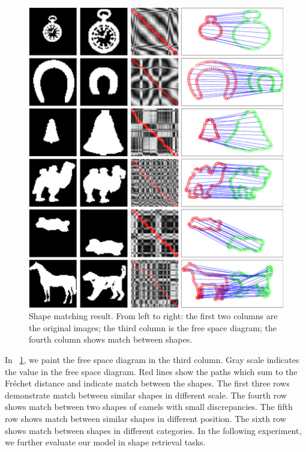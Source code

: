 \documentclass[10pt,letterpaper]{article}
\begin{document}
\begin{figure}[ht]
\begin{center}
\includegraphics[width=1\linewidth]{images/fig9.pdf}
\end{center}
\caption{Shape matching result.
From left to right: the first two columns are the original images;
the third column is the free space diagram;
the fourth column shows match between shapes.} 
\label{fig:9}
\end{figure}

In \figurename~\ref{fig:9},
we paint the free space diagram in the third column.
Gray scale indicates the value in the free space diagram.
Red lines show the paths which sum to the Fr\'echet distance and indicate match between the shapes.
The first three rows demonstrate match between similar shapes in different scale.
The fourth row shows match between two shapes of camels with small discrepancies.
The fifth row shows match between similar shapes in different position.
The sixth row shows match between shapes in different categories.
In the following experiment, we further evaluate our model in shape retrieval tasks.
\end{document}
